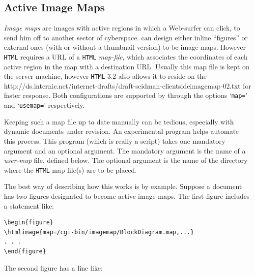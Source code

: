 \subsection{Active Image Maps\label{ImageMaps}}%
%
%
%
%
\begin{changebar}%
\emph{Image maps} are images with active regions in which a 
Web-surfer can click, to send him off to another sector of cyberspace.  
\latextohtml{} can design either inline ``figures'' or external ones 
(with or without a thumbnail version) to be image-maps.  
However \texttt{HTML} requires a URL of a \texttt{HTML} \emph{map-file}, 
which associates the coordinates of each active region in
the map with a destination URL.  
Usually this map file is kept on the server machine, 
however \texttt{HTML} 3.2 also allows it 
to reside on the %
{http://ds.internic.net/internet-drafts/draft-seidman-clientsideimagemap-02.txt} 
for faster response.  
Both configurations are supported by \latextohtml{} 
through the  options
`\texttt{map=}' and `\texttt{usemap=}' respectively.

%
\html{\\}%

Keeping such a map file up to date manually can be tedious, 
especially with dynamic documents under revision.
An experimental program  helps automate this process.  
This program (which is really a \Perl{} script)
takes one mandatory argument and an optional argument.
The mandatory argument is the name of a \emph{user-map} file,
defined below.  The optional argument is the name of the
directory where the \texttt{HTML} map file(s) are to be placed.

\html{\\}%
The best way of describing how this works is by example.
Suppose a document has two figures designated to
become active image-maps.  The first
figure includes a statement like:
\begin{small}
\begin{verbatim}
\begin{figure}
\htmlimage{map=/cgi-bin/imagemap/BlockDiagram.map,...}
. . .
\end{figure}
\end{verbatim}
\end{small}
The second figure has a line like:


\end{changebar}
